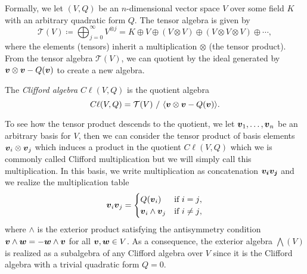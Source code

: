 Formally, we let $(V,Q)$ be an $n$-dimensional vector space $V$ over some field $K$ with an arbitrary quadratic form $Q$.  The tensor algebra is given by
\begin{equation}
\mathcal{T}(V) \coloneqq \bigoplus_{j=0}^\infty V^{\otimes j} = K \oplus V \oplus (V\otimes V) \oplus (V\otimes V \otimes V) \oplus \cdots,
\end{equation}
where the elements (tensors) inherit a multiplication $\otimes$ (the tensor product). From the tensor algebra $\mathcal{T}(V)$, we can quotient by the ideal generated by $\boldsymbol{v}\otimes \boldsymbol{v} - Q(\boldsymbol{v})$ to create a new algebra.
\begin{definition}
The \emph{Clifford algebra} $C\ell(V,Q)$ is the quotient algebra
\begin{equation}
C\ell(V,Q) = \mathcal{T}(V) ~ / ~ \langle \boldsymbol{v} \otimes \boldsymbol{v} - Q(\boldsymbol{v}) \rangle.
\end{equation}
\end{definition}
To see how the tensor product descends to the quotient, we let $\boldsymbol{v}_1, \dots, \boldsymbol{v}_n$ be an arbitrary basis for $V$, then we can consider the tensor product of basis elements $\boldsymbol{v}_i \otimes \boldsymbol{v}_j$ which induces a product in the quotient $C\ell(V,Q)$ which we is commonly called Clifford multiplication but we will simply call this multiplication. In this basis, we write multiplication as concatenation $\boldsymbol{v_i}\boldsymbol{v_j}$ and we realize the multiplication table
\begin{equation}
\label{eq:clifford_multiplication}
\boldsymbol{v}_i \boldsymbol{v}_j = \begin{cases} Q(\boldsymbol{v}_i) & \textrm{if $i=j$}, \\ \boldsymbol{v}_i \wedge \boldsymbol{v}_j & \textrm{if $i\neq j$},\end{cases}
\end{equation}
where $\wedge$ is the exterior product satisfying the antisymmetry condition $\boldsymbol{v}\wedge \boldsymbol{w} = - \boldsymbol{w}\wedge \boldsymbol{v}$ for all $\boldsymbol{v},\boldsymbol{w}\in V$.  As a consequence, the exterior algebra $\bigwedge(V)$ is realized as a subalgebra of any Clifford algebra over $V$ since it is the Clifford algebra with a trivial quadratic form $Q=0$.  


